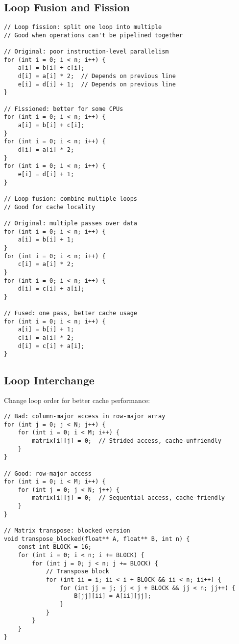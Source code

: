 \subsection{Loop Fusion and Fission}

\begin{lstlisting}
// Loop fission: split one loop into multiple
// Good when operations can't be pipelined together

// Original: poor instruction-level parallelism
for (int i = 0; i < n; i++) {
    a[i] = b[i] + c[i];
    d[i] = a[i] * 2;  // Depends on previous line
    e[i] = d[i] + 1;  // Depends on previous line
}

// Fissioned: better for some CPUs
for (int i = 0; i < n; i++) {
    a[i] = b[i] + c[i];
}
for (int i = 0; i < n; i++) {
    d[i] = a[i] * 2;
}
for (int i = 0; i < n; i++) {
    e[i] = d[i] + 1;
}

// Loop fusion: combine multiple loops
// Good for cache locality

// Original: multiple passes over data
for (int i = 0; i < n; i++) {
    a[i] = b[i] + 1;
}
for (int i = 0; i < n; i++) {
    c[i] = a[i] * 2;
}
for (int i = 0; i < n; i++) {
    d[i] = c[i] + a[i];
}

// Fused: one pass, better cache usage
for (int i = 0; i < n; i++) {
    a[i] = b[i] + 1;
    c[i] = a[i] * 2;
    d[i] = c[i] + a[i];
}
\end{lstlisting}

\subsection{Loop Interchange}

Change loop order for better cache performance:

\begin{lstlisting}
// Bad: column-major access in row-major array
for (int j = 0; j < N; j++) {
    for (int i = 0; i < M; i++) {
        matrix[i][j] = 0;  // Strided access, cache-unfriendly
    }
}

// Good: row-major access
for (int i = 0; i < M; i++) {
    for (int j = 0; j < N; j++) {
        matrix[i][j] = 0;  // Sequential access, cache-friendly
    }
}

// Matrix transpose: blocked version
void transpose_blocked(float** A, float** B, int n) {
    const int BLOCK = 16;
    for (int i = 0; i < n; i += BLOCK) {
        for (int j = 0; j < n; j += BLOCK) {
            // Transpose block
            for (int ii = i; ii < i + BLOCK && ii < n; ii++) {
                for (int jj = j; jj < j + BLOCK && jj < n; jj++) {
                    B[jj][ii] = A[ii][jj];
                }
            }
        }
    }
}
\end{lstlisting}

